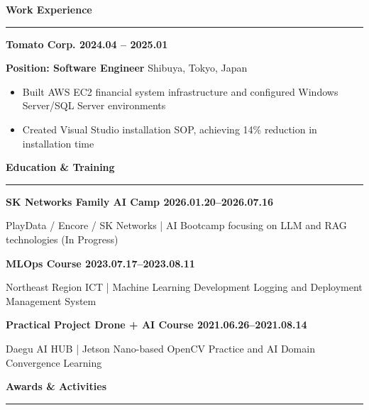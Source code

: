 \documentclass[a4paper, 10pt]{article}
\newcommand{\resumesection}[1]{%
  \vspace{8pt}
  \noindent
  {\large\bfseries #1}
  \vspace{2pt}
  \noindent\hrule
  \vspace{4pt}
}
\begin{document}

\resumesection{Work Experience}

\vspace{2pt}
\noindent
\textbf{Tomato Corp. \hfill 2024.04 -- 2025.01}

\noindent
\textbf{\quad Position: Software Engineer} \hfill Shibuya, Tokyo, Japan

\begin{itemize}
  \setlength{\itemsep}{1pt}
  \setlength{\parskip}{0pt}
  \item Built AWS EC2 financial system infrastructure and configured Windows Server/SQL Server environments
  \item Created Visual Studio installation SOP, achieving 14\% reduction in installation time
\end{itemize}


\resumesection{Education \& Training}

\vspace{2pt}
\noindent
\textbf{SK Networks Family AI Camp \hfill 2026.01.20--2026.07.16}

\noindent
{\small PlayData / Encore / SK Networks | AI Bootcamp focusing on LLM and RAG technologies (In Progress)}

\vspace{3pt}
\noindent
\textbf{MLOps Course \hfill 2023.07.17--2023.08.11}

\noindent
{\small Northeast Region ICT | Machine Learning Development Logging and Deployment Management System}

\vspace{3pt}
\noindent
\textbf{Practical Project Drone + AI Course \hfill 2021.06.26--2021.08.14}

\noindent
{\small Daegu AI HUB | Jetson Nano-based OpenCV Practice and AI Domain Convergence Learning}


\resumesection{Awards \& Activities}
\end{document}
